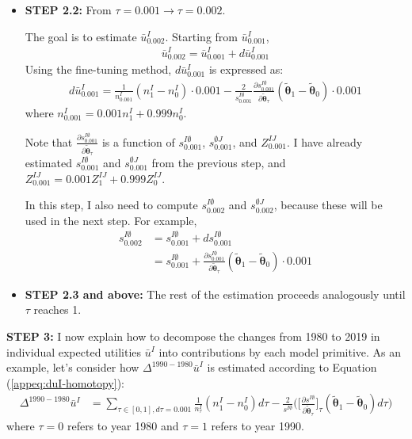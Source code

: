 \begin{itemize}	
	\item \textbf{STEP 2.2:} From $\tau = 0.001 \rightarrow \tau = 0.002$.
	
	
	The goal is to estimate $\bar{u}^I_{0.002}$. Starting from $\bar{u}^I_{0.001}$, 
	\begin{align*}
		\bar{u}^I_{0.002} = \bar{u}^I_{0.001} + d\bar{u}^I_{0.001}
	\end{align*}
	Using the fine-tuning method, $d\bar{u}^I_{0.001}$ is expressed as:
	\begin{align*}
		d\bar{u}^I_{0.001} = \frac{1}{n^I_{0.001}} (n^I_1 - n^I_0)\cdot 0.001 - \frac{2}{s^{I\emptyset}_{0.001}} \frac{\partial s^{I\emptyset}_{0.001}}{\partial \tilde{\boldsymbol{\theta}}_\tau} (\tilde{\boldsymbol{\theta}}_1 - \tilde{\boldsymbol{\theta}}_0)\cdot 0.001
	\end{align*}
	where $n^I_{0.001} = 0.001 n^I_1 + 0.999 n^I_0$.
	
	Note that $\frac{\partial s^{I\emptyset}_{0.001}}{\partial \tilde{\boldsymbol{\theta}}_\tau}$ is a function of $s^{I\emptyset}_{0.001}$, $s^{\emptyset J}_{0.001}$, and $Z^{IJ}_{0.001}$. I have already estimated $s^{I\emptyset}_{0.001}$ and $s^{\emptyset J}_{0.001}$ from the previous step, and $Z^{IJ}_{0.001} = 0.001Z^{IJ}_1 + 0.999 Z^{IJ}_0$. 
	
	
	In this step, I also need to compute $s^{I\emptyset}_{0.002}$ and $s^{\emptyset J}_{0.002}$, because these will be used in the next step. For example, 
	\begin{align*}
		s^{I\emptyset}_{0.002} &= s^{I\emptyset}_{0.001} + d s^{I\emptyset}_{0.001} \\
		&= s^{I\emptyset}_{0.001} + \frac{\partial s^{I\emptyset}_{0.001}}{\partial \tilde{\boldsymbol{\theta}}_\tau} (\tilde{\boldsymbol{\theta}}_1 - \tilde{\boldsymbol{\theta}}_{0})\cdot 0.001
	\end{align*}
	
	\item \textbf{STEP 2.3 and above:} The rest of the estimation proceeds analogously until $\tau$ reaches 1. 
\end{itemize}


\vspace{5mm} 
\noindent\textbf{STEP 3:} I now explain how to decompose the changes from 1980 to 2019 in individual expected utilities $\bar{u}^I$ into contributions by each model primitive. As an example, let's consider how $\Delta^{1990-1980} \bar{u}^I$ is estimated according to Equation (\ref{appeq:duI-homotopy}):
\begin{align*}
	\Delta^{1990-1980} \bar{u}^I &= \sum_{\tau \in [0,1], d\tau = 0.001} \frac{1}{n^I_\tau}(n^I_1 - n^I_0)d\tau -  \frac{2}{s^{I\emptyset}} \Big(  \Big[\frac{\partial s^{I\emptyset} }{\partial \tilde{\boldsymbol{\theta}}_\tau} \Big]_\tau (\tilde{\boldsymbol{\theta}}_1 - \tilde{\boldsymbol{\theta}}_0)d\tau  \Big) 
\end{align*}
where $\tau = 0$ refers to year 1980 and $\tau = 1$ refers to year 1990. 

